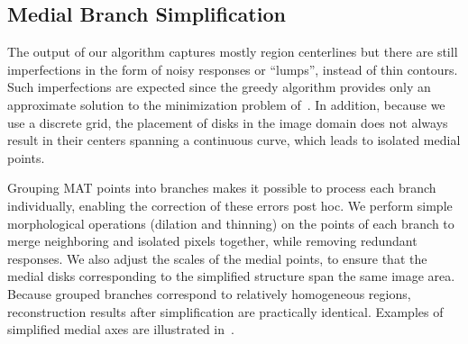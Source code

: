 \documentclass[10pt,twocolumn,letterpaper]{article}
\begin{document}


\subsection{Medial Branch Simplification}\label{sec:method:simplification}
The output of our algorithm captures mostly region centerlines but there are still
imperfections in the form of noisy responses or ``lumps'', instead of thin contours.
Such imperfections are expected since the greedy algorithm provides only an approximate solution
to the minimization problem of~. 
In addition, because we use a discrete grid, the placement of disks 
in the image domain does not always result in their centers spanning a continuous curve, 
which leads to isolated medial points.

Grouping MAT points into branches makes it possible to process each branch individually, enabling
the correction of these errors post hoc.
We perform simple morphological operations (dilation and thinning) 
on the points of each branch to merge neighboring and isolated pixels together, while removing 
redundant responses. 
We also adjust the scales of the medial points, to ensure that the medial disks corresponding 
to the simplified structure span the same image area.
Because grouped branches correspond to relatively homogeneous regions, reconstruction
results after simplification are practically identical.
Examples of simplified medial axes are illustrated in~.


\end{document}
